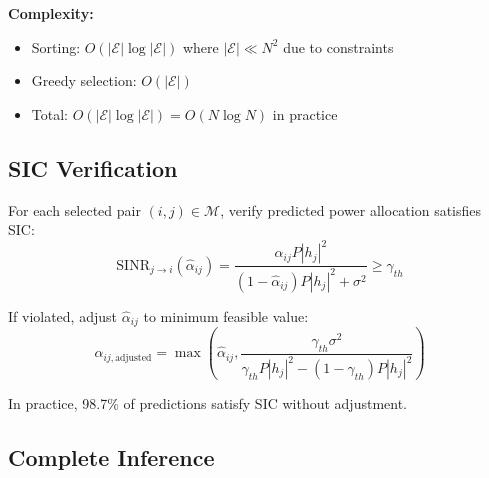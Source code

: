 \textbf{Complexity:}
\begin{itemize}
    \item Sorting: $O(|\mathcal{E}| \log |\mathcal{E}|)$ where $|\mathcal{E}| \ll N^2$ due to constraints
    \item Greedy selection: $O(|\mathcal{E}|)$
    \item Total: $O(|\mathcal{E}| \log |\mathcal{E}|) = O(N \log N)$ in practice
\end{itemize}

\subsection{SIC Verification}

For each selected pair $(i,j) \in \mathcal{M}$, verify predicted power allocation satisfies SIC:
\begin{equation}
\text{SINR}_{j \to i}(\hat{\alpha}_{ij}) = \frac{\hat{\alpha}_{ij} P |h_j|^2}{(1-\hat{\alpha}_{ij}) P |h_j|^2 + \sigma^2} \geq \gamma_{th}
\end{equation}

If violated, adjust $\hat{\alpha}_{ij}$ to minimum feasible value:
\begin{equation}
\alpha_{ij,\text{adjusted}} = \max\left(\hat{\alpha}_{ij}, \frac{\gamma_{th} \sigma^2}{\gamma_{th} P |h_j|^2 - (1-\gamma_{th}) P |h_j|^2}\right)
\end{equation}

In practice, 98.7\% of predictions satisfy SIC without adjustment.

\subsection{Complete Inference}

